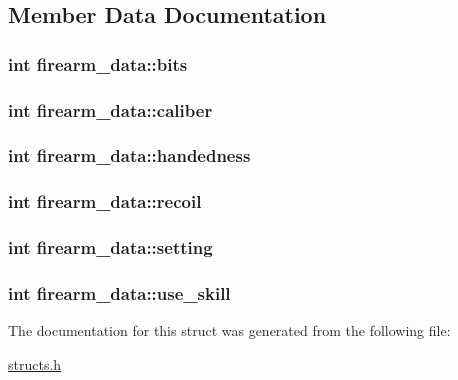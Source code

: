 \subsection{Member Data Documentation}
\hypertarget{structfirearm__data_a2299ff148fc0cf282f8ba6cdb1e3b2c2}{
\subsubsection[{bits}]{\setlength{\rightskip}{0pt plus 5cm}int firearm\-\_\-data\-::bits}}\label{structfirearm__data_a2299ff148fc0cf282f8ba6cdb1e3b2c2}
\hypertarget{structfirearm__data_a3cee40a699ac83198eeb87558d37b4e5}{
\subsubsection[{caliber}]{\setlength{\rightskip}{0pt plus 5cm}int firearm\-\_\-data\-::caliber}}\label{structfirearm__data_a3cee40a699ac83198eeb87558d37b4e5}
\hypertarget{structfirearm__data_afcc3b09e0b9265b8f744bde08a722af7}{
\subsubsection[{handedness}]{\setlength{\rightskip}{0pt plus 5cm}int firearm\-\_\-data\-::handedness}}\label{structfirearm__data_afcc3b09e0b9265b8f744bde08a722af7}
\hypertarget{structfirearm__data_adf714faac6c2473fc6a4b6a21e7a9595}{
\subsubsection[{recoil}]{\setlength{\rightskip}{0pt plus 5cm}int firearm\-\_\-data\-::recoil}}\label{structfirearm__data_adf714faac6c2473fc6a4b6a21e7a9595}
\hypertarget{structfirearm__data_abcdf5e78cbcf3d2cb530e21aef3338bf}{
\subsubsection[{setting}]{\setlength{\rightskip}{0pt plus 5cm}int firearm\-\_\-data\-::setting}}\label{structfirearm__data_abcdf5e78cbcf3d2cb530e21aef3338bf}
\hypertarget{structfirearm__data_a2b7980961b78c7521e1d33be34ca1bbd}{
\subsubsection[{use\-\_\-skill}]{\setlength{\rightskip}{0pt plus 5cm}int firearm\-\_\-data\-::use\-\_\-skill}}\label{structfirearm__data_a2b7980961b78c7521e1d33be34ca1bbd}


The documentation for this struct was generated from the following file\-:\begin{DoxyCompactItemize}
\item 
\hyperlink{structs_8h}{structs.\-h}\end{DoxyCompactItemize}
